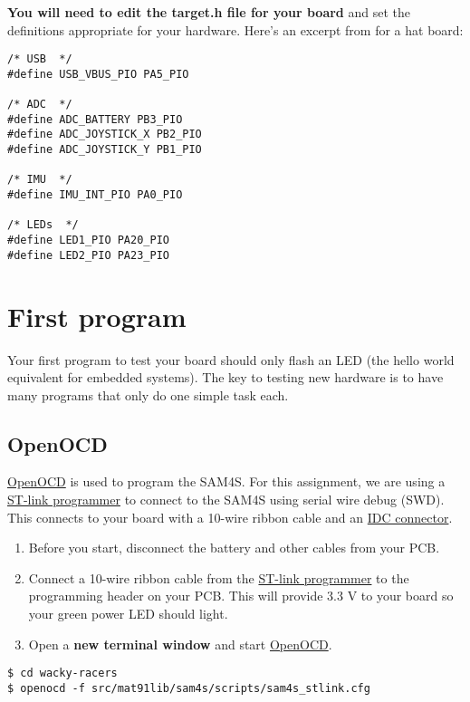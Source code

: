 \textbf{You will need to edit the target.h file for your board} and set
the definitions appropriate for your hardware. Here's an excerpt from
 for a hat board:

\begin{verbatim}
/* USB  */
#define USB_VBUS_PIO PA5_PIO

/* ADC  */
#define ADC_BATTERY PB3_PIO
#define ADC_JOYSTICK_X PB2_PIO
#define ADC_JOYSTICK_Y PB1_PIO

/* IMU  */
#define IMU_INT_PIO PA0_PIO

/* LEDs  */
#define LED1_PIO PA20_PIO
#define LED2_PIO PA23_PIO
\end{verbatim}

\section{First program}
\label{first-program}

Your first program to test your board should only flash an LED (the
hello world equivalent for embedded systems). The key to testing new
hardware is to have many programs that only do one simple task each.

\subsection{OpenOCD}
\label{openocd}

\url{OpenOCD} is used to program the SAM4S. For this assignment, we are
using a \href{ST-link_programmer}{ST-link programmer} to connect to the
SAM4S using serial wire debug (SWD). This connects to your board with a
10-wire ribbon cable and an \href{IDC_connector}{IDC connector}.

\begin{enumerate}
\item
  Before you start, disconnect the battery and other cables from your
  PCB.
\item
  Connect a 10-wire ribbon cable from the
  \href{ST-link_programmer}{ST-link programmer} to the programming
  header on your PCB. This will provide 3.3 V to your board so your
  green power LED should light.
\item
  Open a \textbf{new terminal window} and start \url{OpenOCD}.
\end{enumerate}

\begin{verbatim}
$ cd wacky-racers
$ openocd -f src/mat91lib/sam4s/scripts/sam4s_stlink.cfg
\end{verbatim}

